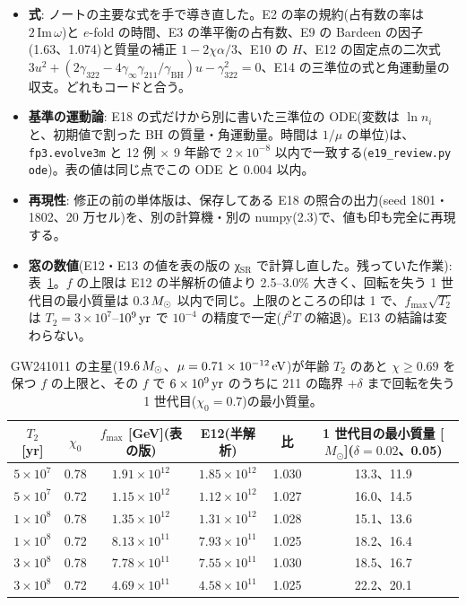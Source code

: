 \begin{itemize}
\item \textbf{式}: ノートの主要な式を手で導き直した。E2 の率の規約(占有数の率は $2\,\mathrm{Im}\,\omega$)と $e$-fold の時間、E3 の準平衡の占有数、E9 の Bardeen の因子(1.63、1.074)と質量の補正 $1-2\chi\alpha/3$、E10 の $H$、E12 の固定点の二次式 $3u^2+(2\gamma_{322}-4\gamma_\infty\gamma_{211}/\gamma_\mathrm{BH})u-\gamma_{322}^2=0$、E14 の三準位の式と角運動量の収支。どれもコードと合う。
\item \textbf{基準の運動論}: E18 の式だけから別に書いた三準位の ODE(変数は $\ln n_i$ と、初期値で割った BH の質量・角運動量。時間は $1/\mu$ の単位)は、\texttt{fp3.evolve3m} と 12 例 × 9 年齢で $2\times10^{-8}$ 以内で一致する(\texttt{e19\_review.py ode})。表の値は同じ点でこの ODE と 0.004 以内。
\item \textbf{再現性}: 修正の前の単体版は、保存してある E18 の照合の出力(seed 1801・1802、20 万セル)を、別の計算機・別の numpy(2.3)で、値も印も完全に再現する。
\item \textbf{窓の数値}(E12・E13 の値を表の版の χ$_\mathrm{SR}$ で計算し直した。残っていた作業): 表~\ref{tab:e19window}。$f$ の上限は E12 の半解析の値より 2.5--3.0\% 大きく、回転を失う 1 世代目の最小質量は 0.3$\,M_\odot$ 以内で同じ。上限のところの印は 1 で、$f_\mathrm{max}\sqrt{T_2}$ は $T_2=3\times10^7$--$10^9\,\mathrm{yr}$ で $10^{-4}$ の精度で一定($f^2T$ の縮退)。E13 の結論は変わらない。
\end{itemize}

\begin{table}[H]
\centering\small
\begin{tabular}{cccccc}
\toprule
$T_2$ [yr] & $\chi_0$ & $f_\mathrm{max}$ [GeV](表の版) & E12(半解析) & 比 & 1 世代目の最小質量 [$M_\odot$]($\delta=0.02$、0.05)\\
\midrule
$5\times10^7$ & 0.78 & $1.91\times10^{12}$ & $1.85\times10^{12}$ & 1.030 & 13.3、11.9\\
$5\times10^7$ & 0.72 & $1.15\times10^{12}$ & $1.12\times10^{12}$ & 1.027 & 16.0、14.5\\
$1\times10^{8}$ & 0.78 & $1.35\times10^{12}$ & $1.31\times10^{12}$ & 1.028 & 15.1、13.6\\
$1\times10^{8}$ & 0.72 & $8.13\times10^{11}$ & $7.93\times10^{11}$ & 1.025 & 18.2、16.4\\
$3\times10^{8}$ & 0.78 & $7.78\times10^{11}$ & $7.55\times10^{11}$ & 1.030 & 18.5、16.7\\
$3\times10^{8}$ & 0.72 & $4.69\times10^{11}$ & $4.58\times10^{11}$ & 1.025 & 22.2、20.1\\
\bottomrule
\end{tabular}
\caption{GW241011 の主星($19.6\,M_\odot$、$\mu=0.71\times10^{-12}\,\mathrm{eV}$)が年齢 $T_2$ のあと $\chi\ge0.69$ を保つ $f$ の上限と、その $f$ で $6\times10^9\,\mathrm{yr}$ のうちに 211 の臨界 $+\delta$ まで回転を失う 1 世代目($\chi_0=0.7$)の最小質量。}
\label{tab:e19window}
\end{table}

